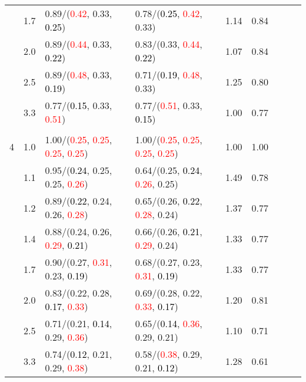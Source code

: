 \documentclass[10pt,a4paper]{report}
\begin{document}
\begin{table}[!htbp]
\begin{center}
{\begin{tabular}{ccllccccc}
			&1.7&0.89/(\textcolor{red}{0.42}, 0.33, \textcolor{black}{0.25})&0.78/(\textcolor{black}{0.25}, \textcolor{red}{0.42}, 0.33)&1.14&0.84\\
			&2.0&0.89/(\textcolor{red}{0.44}, 0.33, \textcolor{black}{0.22})&0.83/(0.33, \textcolor{red}{0.44}, \textcolor{black}{0.22})&1.07&0.84\\
			&2.5&0.89/(\textcolor{red}{0.48}, 0.33, \textcolor{black}{0.19})&0.71/(\textcolor{black}{0.19}, \textcolor{red}{0.48}, 0.33)&1.25&0.80\\
			&3.3&0.77/(\textcolor{black}{0.15}, 0.33, \textcolor{red}{0.51})&0.77/(\textcolor{red}{0.51}, 0.33, \textcolor{black}{0.15})&1.00&0.77\\
			&&&&\\
			4			&1.0&1.00/(\textcolor{red}{0.25}, \textcolor{red}{0.25}, \textcolor{red}{0.25}, \textcolor{red}{0.25})&1.00/(\textcolor{red}{0.25}, \textcolor{red}{0.25}, \textcolor{red}{0.25}, \textcolor{red}{0.25})&1.00&1.00\\
			&1.1&0.95/(\textcolor{black}{0.24}, 0.25, 0.25, \textcolor{red}{0.26})&0.64/(0.25, \textcolor{black}{0.24}, \textcolor{red}{0.26}, 0.25)&1.49&0.78\\
			&1.2&0.89/(\textcolor{black}{0.22}, 0.24, 0.26, \textcolor{red}{0.28})&0.65/(0.26, \textcolor{black}{0.22}, \textcolor{red}{0.28}, 0.24)&1.37&0.77\\
			&1.4&0.88/(0.24, 0.26, \textcolor{red}{0.29}, \textcolor{black}{0.21})&0.66/(0.26, \textcolor{black}{0.21}, \textcolor{red}{0.29}, 0.24)&1.33&0.77\\
			&1.7&0.90/(0.27, \textcolor{red}{0.31}, 0.23, \textcolor{black}{0.19})&0.68/(0.27, 0.23, \textcolor{red}{0.31}, \textcolor{black}{0.19})&1.33&0.77\\
			&2.0&0.83/(0.22, 0.28, \textcolor{black}{0.17}, \textcolor{red}{0.33})&0.69/(0.28, 0.22, \textcolor{red}{0.33}, \textcolor{black}{0.17})&1.20&0.81\\
			&2.5&0.71/(0.21, \textcolor{black}{0.14}, 0.29, \textcolor{red}{0.36})&0.65/(\textcolor{black}{0.14}, \textcolor{red}{0.36}, 0.29, 0.21)&1.10&0.71\\
			&3.3&0.74/(\textcolor{black}{0.12}, 0.21, 0.29, \textcolor{red}{0.38})&0.58/(\textcolor{red}{0.38}, 0.29, 0.21, \textcolor{black}{0.12})&1.28&0.61\\
			\bottomrule
		\end{tabular}}
	\end{center}
\end{table}
\end{document}
